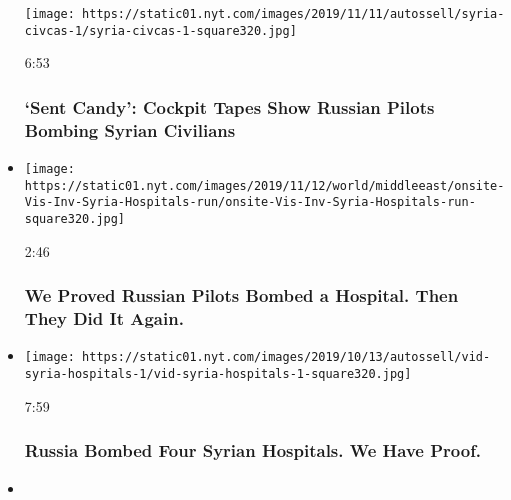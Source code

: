 \begin{itemize}
  \texttt{[image: https://static01.nyt.com/images/2019/11/11/autossell/syria-civcas-1/syria-civcas-1-square320.jpg]}

  6:53

  \hypertarget{sent-candy-cockpit-tapes-show-russian-pilots-bombing-syrian-civilians}{%
  \subsubsection{`Sent Candy': Cockpit Tapes Show Russian Pilots Bombing
  Syrian
  Civilians}\label{sent-candy-cockpit-tapes-show-russian-pilots-bombing-syrian-civilians}}
\item
  \href{https://www.nytimes.com/video/world/middleeast/100000006815692/syria-hospitals-russia.html?action=click\&module=video-series-bar\&region=header\&pgtype=Article\&playlistId=video/investigations}{}

  \texttt{[image: https://static01.nyt.com/images/2019/11/12/world/middleeast/onsite-Vis-Inv-Syria-Hospitals-run/onsite-Vis-Inv-Syria-Hospitals-run-square320.jpg]}

  2:46

  \hypertarget{we-proved-russian-pilots-bombed-a-hospital-then-they-did-it-again}{%
  \subsubsection{We Proved Russian Pilots Bombed a Hospital. Then They
  Did It
  Again.}\label{we-proved-russian-pilots-bombed-a-hospital-then-they-did-it-again}}
\item
  \href{https://www.nytimes.com/video/world/middleeast/100000005697485/russia-bombed-syrian-hospitals.html?action=click\&module=video-series-bar\&region=header\&pgtype=Article\&playlistId=video/investigations}{}

  \texttt{[image: https://static01.nyt.com/images/2019/10/13/autossell/vid-syria-hospitals-1/vid-syria-hospitals-1-square320.jpg]}

  7:59

  \hypertarget{russia-bombed-four-syrian-hospitals-we-have-proof}{%
  \subsubsection{Russia Bombed Four Syrian Hospitals. We Have
  Proof.}\label{russia-bombed-four-syrian-hospitals-we-have-proof}}
\item
  \href{https://www.nytimes.com/video/world/asia/100000006745719/hong-kong-protester-shot.html?action=click\&module=video-series-bar\&region=header\&pgtype=Article\&playlistId=video/investigations}{}


\end{itemize}

